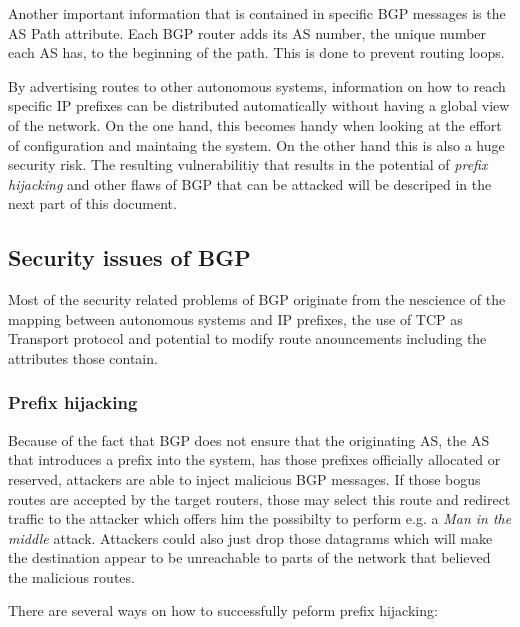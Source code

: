 \documentclass[12pt]{IEEEtran}
\begin{document}
	Another important information that is contained in specific BGP messages is the  AS Path attribute. Each BGP router adds its AS number, the unique number each AS has, to the beginning of the path. This is done to prevent routing loops. 

	By advertising routes to other autonomous systems, information on how to reach specific IP prefixes can be distributed automatically without having a global view of the network. On the one hand, this becomes handy when looking at the effort of configuration and maintaing the system. On the other hand this is also a huge security risk.
	The resulting vulnerabilitiy that results in the potential of \emph{prefix hijacking} and other flaws of BGP that can be attacked will be descriped in the next part of this document. 
	
	\subsection{Security issues of BGP}
		Most of the security related problems of BGP originate from the nescience of the mapping between autonomous systems and IP prefixes, the use of TCP as Transport protocol and potential to modify route anouncements including the attributes those contain.

		\subsubsection{Prefix hijacking}
		Because of the fact that BGP does not ensure that the originating AS, the AS that introduces a prefix into the system, has those prefixes officially allocated or reserved, attackers are able to inject malicious BGP messages. 
		If those bogus routes are accepted by the target routers, those may select this route and redirect traffic to the attacker which offers him the possibilty to perform e.g. a \emph{Man in the middle} attack. Attackers could also just drop those datagrams which will make the destination appear to be unreachable to parts of the network that believed the malicious routes. 

		There are several ways on how to successfully peform prefix hijacking:
\end{document}
